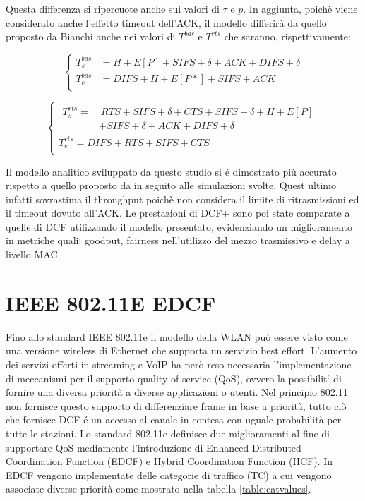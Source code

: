 
Questa differenza si ripercuote anche sui valori di $\tau$ e $p$.
In aggiunta, poich\`e viene considerato anche l'effetto timeout dell'ACK, il modello differir\`a da quello proposto da Bianchi anche nei valori di $T^{bas}$ e $T^{rts}$ che saranno, rispettivamente:

$$
\begin{cases}
T_{s}^{bas} &= H + E[P] + SIFS + \delta + ACK + DIFS + \delta \\
T_{c}^{bas} &= DIFS + H + E[P*] + SIFS + ACK \\
\end{cases}
$$

$$
\begin{cases}
\!\begin{aligned}
T_{s}^{rts} =  &\ RTS + SIFS + \delta + CTS + SIFS + \delta + H + E[P]  \\ & + SIFS + \delta + ACK + DIFS + \delta 
\end{aligned}
\\
T_{c}^{rts} = DIFS + RTS + SIFS + CTS \\
\end{cases}
$$

Il modello analitico sviluppato da questo studio si \'e dimostrato pi\`u accurato rispetto a quello proposto da \cite{bianchi2000performance} in seguito alle simulazioni svolte.
Quest ultimo infatti sovrastima il throughput poich\`e non considera il limite di ritrasmissioni ed il timeout dovuto all'ACK.
Le prestazioni di DCF+ sono poi state comparate a quelle di DCF utilizzando il modello presentato, evidenziando un miglioramento in metriche quali: goodput, fairness nell'utilizzo del mezzo trasmissivo e delay a livello MAC.

\newpage
\section{IEEE 802.11E EDCF}
Fino allo standard IEEE 802.11e \cite{ieee05} il modello della WLAN pu\`o essere visto come una versione wireless di Ethernet che supporta un servizio best effort.
L'aumento dei servizi offerti in streaming e VoIP ha per\`o reso necessaria l'implementazione di meccanismi per il supporto quality of service (QoS), ovvero la possibilit\a` di fornire una diversa priorit\`a a diverse applicazioni o utenti.
Nel principio 802.11 non fornisce questo supporto di differenziare frame in base a priorit\`a, tutto ci\`o che fornisce DCF \'e un accesso al canale in contesa con uguale probabilit\`a per tutte le stazioni.
Lo standard 802.11e definisce due miglioramenti al fine di supportare QoS mediamente l'introduzione di Enhanced Distributed Coordination Function (EDCF) e Hybrid Coordination Function (HCF).
In EDCF vengono implementate delle categorie di traffico (TC) a cui vengono associate diverse priorit\`a come mostrato nella tabella \ref{table:catvalues}.

